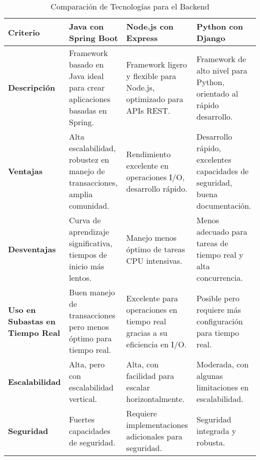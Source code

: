 \begin{table}[ht]
\centering
\begin{tabular}{ 
   >{\raggedright\arraybackslash}p{3cm} 
   >{\raggedright\arraybackslash}p{3cm} 
   >{\raggedright\arraybackslash}p{3cm} 
   >{\raggedright\arraybackslash}p{3cm} }
\toprule
\textbf{Criterio} & \textbf{Java con Spring Boot} & \textbf{Node.js con Express} & \textbf{Python con Django} \\
\midrule
\textbf{Descripción} & Framework basado en Java ideal para crear aplicaciones basadas en Spring. & Framework ligero y flexible para Node.js, optimizado para APIs REST. & Framework de alto nivel para Python, orientado al rápido desarrollo. \\
\midrule
\textbf{Ventajas} & Alta escalabilidad, robustez en manejo de transacciones, amplia comunidad. & Rendimiento excelente en operaciones I/O, desarrollo rápido. & Desarrollo rápido, excelentes capacidades de seguridad, buena documentación. \\
\midrule
\textbf{Desventajas} & Curva de aprendizaje significativa, tiempos de inicio más lentos. & Manejo menos óptimo de tareas CPU intensivas. & Menos adecuado para tareas de tiempo real y alta concurrencia. \\
\midrule
\textbf{Uso en Subastas en Tiempo Real} & Buen manejo de transacciones pero menos óptimo para tiempo real. & Excelente para operaciones en tiempo real gracias a su eficiencia en I/O. & Posible pero requiere más configuración para tiempo real. \\
\midrule
\textbf{Escalabilidad} & Alta, pero con escalabilidad vertical. & Alta, con facilidad para escalar horizontalmente. & Moderada, con algunas limitaciones en escalabilidad. \\
\midrule
\textbf{Seguridad} & Fuertes capacidades de seguridad. & Requiere implementaciones adicionales para seguridad. & Seguridad integrada y robusta. \\
\bottomrule
\end{tabular}
\caption{Comparación de Tecnologías para el Backend}
\label{tabla:comparacion_backend}
\end{table}



